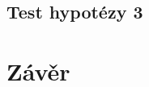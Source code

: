 \documentclass[11pt, a4paper]{article}
\begin{document}
\subsection{Test hypotézy 3}

\section{Závěr}



    
\end{document}
